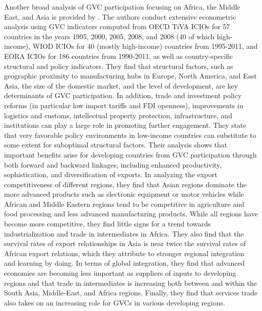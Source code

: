 \documentclass[a4paper]{article}
\begin{document}
Another broad analysis of GVC participation focusing on Africa, the Middle East, and Asia is provided by \citet{kowalski2015participation}. The authors conduct extensive econometric analysis using GVC indicators computed from OECD TiVA ICIOs for 57 countries in the years 1995, 2000, 2005, 2008, and 2008 (40 of which high-income), WIOD ICIOs for 40 (mostly high-income) countries from 1995-2011, and EORA ICIOs for 186 countries from 1990-2011, as well as country-specific structural and policy indicators. They find that structural factors, such as geographic proximity to manufacturing hubs in Europe, North America, and East Asia, the size of the domestic market, and the level of development, are key determinants of GVC participation. In addition, trade and investment policy reforms (in particular low import tariffs and FDI openness), improvements in logistics and customs, intellectual property protection, infrastructure, and institutions can play a large role in promoting further engagement. They state that very favorable policy environments in low-income countries can substitute to some extent for suboptimal structural factors. Their analysis shows that important benefits arise for developing countries from GVC participation through both forward and backward linkages, including enhanced productivity, sophistication, and diversification of exports. In analyzing the export competitiveness of different regions, they find that Asian regions dominate the more advanced products such as electronic equipment or motor vehicles while African and Middle Eastern regions tend to be competitive in agriculture and food processing and less advanced manufacturing products. While all regions have become more competitive, they find little signs for a trend towards industrialization and trade in intermediates in Africa. They also find that the survival rates of export relationships in Asia is near twice the survival rates of African export relations, which they attribute to stronger regional integration and learning by doing. In terms of global integration, they find that advanced economies are becoming less important as suppliers of inputs to developing regions and that trade in intermediates is increasing both between and within the South Asia, Middle-East, and Africa regions. Finally, they find that services trade also takes on an increasing role for GVCs in various developing regions. \newline 
\end{document}
